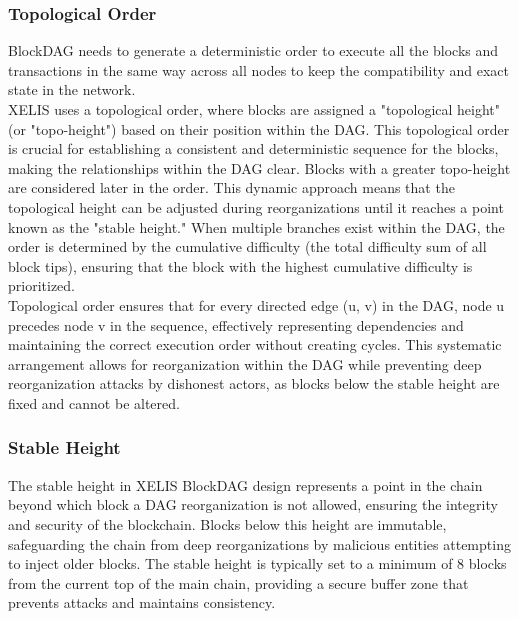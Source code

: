 \documentclass[10pt,a4paper,twocolumn]{article}
\begin{document}
\subsubsection{Topological Order}

BlockDAG needs to generate a deterministic order to execute all the blocks and transactions in the same way across all nodes to keep the compatibility and exact state in the network. \\

XELIS uses a topological order, where blocks are assigned a "topological height" (or "topo-height") based on their position within the DAG. This topological order is crucial for establishing a consistent and deterministic sequence for the blocks, making the relationships within the DAG clear. Blocks with a greater topo-height are considered later in the order. This dynamic approach means that the topological height can be adjusted during reorganizations until it reaches a point known as the "stable height." When multiple branches exist within the DAG, the order is determined by the cumulative difficulty (the total difficulty sum of all block tips), ensuring that the block with the highest cumulative difficulty is prioritized.\\

Topological order ensures that for every directed edge (u, v) in the DAG, node u precedes node v in the sequence, effectively representing dependencies and maintaining the correct execution order without creating cycles. This systematic arrangement allows for reorganization within the DAG while preventing deep reorganization attacks by dishonest actors, as blocks below the stable height are fixed and cannot be altered.\\

\subsubsection{Stable Height}

The stable height in XELIS BlockDAG design represents a point in the chain beyond which block a DAG reorganization is not allowed, ensuring the integrity and security of the blockchain. Blocks below this height are immutable, safeguarding the chain from deep reorganizations by malicious entities attempting to inject older blocks. The stable height is typically set to a minimum of 8 blocks from the current top of the main chain, providing a secure buffer zone that prevents attacks and maintains consistency.
\end{document}

